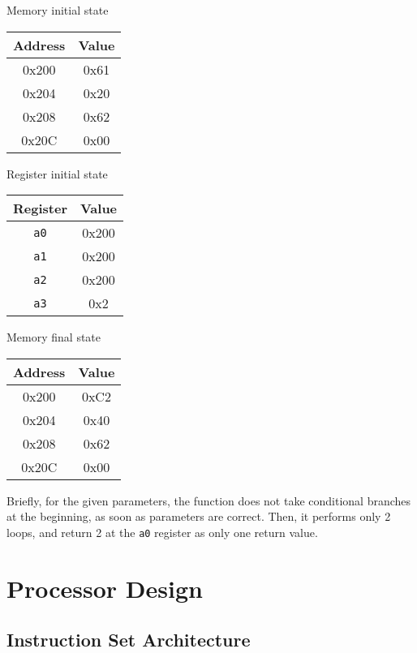 \documentclass[a4paper]{article}
\begin{document}
\begin{multicols}{3}

\centering
Memory initial state\\
\begin{tabular}{c c}
        \textbf{Address} & \textbf{Value} \\
        \hline \hline
        0x200 & 0x61 \\
        0x204 & 0x20 \\
        0x208 & 0x62 \\
        0x20C & 0x00 \\
    \end{tabular}


\centering
Register initial state\\
\begin{tabular}{c c}
        \textbf{Register} & \textbf{Value} \\
        \hline \hline
        \texttt{a0} & 0x200 \\
        \texttt{a1} & 0x200 \\
        \texttt{a2} & 0x200 \\
        \texttt{a3} & 0x2 \\
    \end{tabular}
    
\centering
Memory final state\\
\begin{tabular}{c c}
        \textbf{Address} & \textbf{Value} \\
        \hline \hline
        0x200 & 0xC2 \\
        0x204 & 0x40 \\
        0x208 & 0x62 \\
        0x20C & 0x00 \\
    \end{tabular}
\end{multicols}

Briefly, for the given parameters, the function does not take conditional branches at the beginning, as soon as parameters are correct.
Then, it performs only 2 loops, and return 2 at the \texttt{a0} register as only one return value.

\section{Processor Design}
\subsection{Instruction Set Architecture}
\end{document}
